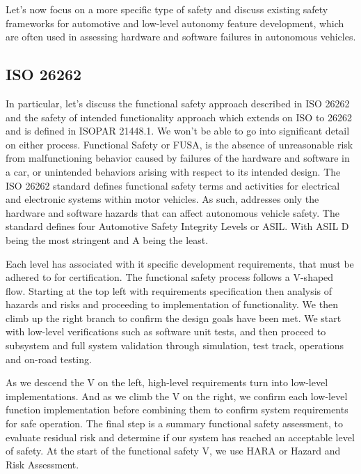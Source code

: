 Let's now focus on a more specific type of safety and discuss existing safety frameworks for automotive and low-level autonomy feature development, 
which are often used in assessing hardware and software failures in autonomous vehicles. 

\subsection{ISO 26262}

In particular, let's discuss the functional safety approach described in ISO 26262 and the safety of intended functionality approach which extends on ISO to 26262 
and is defined in ISOPAR 21448.1. We won't be able to go into significant detail on either process. 
 Functional Safety or FUSA, is the absence of unreasonable risk from malfunctioning behavior caused by failures of the hardware and software in a car, 
 or unintended behaviors arising with respect to its intended design. 
 The ISO 26262 standard defines functional safety terms and activities for electrical and electronic systems within motor vehicles. 
 As such, addresses only the hardware and software hazards that can affect autonomous vehicle safety. 
 The standard defines four Automotive Safety Integrity Levels or ASIL. With ASIL D being the most stringent and A being the least. 
 
 Each level has associated with it specific development requirements, that must be adhered to for certification. 
 The functional safety process follows a V-shaped flow. Starting at the top left with requirements specification then analysis of 
 hazards and risks and proceeding to implementation of functionality. 
 We then climb up the right branch to confirm the design goals have been met. We start with low-level verifications such as 
 software unit tests, and then proceed to subsystem and full system validation 
 through simulation, test track, operations and on-road testing. 
 
 As we descend the V on the left, high-level requirements turn into low-level implementations. 
 And as we climb the V on the right, we confirm each low-level function implementation before combining them 
 to confirm system requirements for safe operation. The final step is a summary functional safety assessment, to evaluate residual 
 risk and determine if our system has reached an acceptable level of safety. At the start of the functional safety V, we use HARA or Hazard and Risk Assessment. 
 
